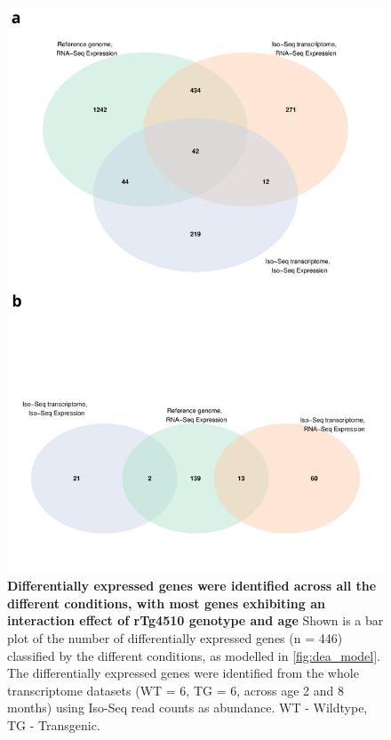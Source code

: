 \begin{figure}[h]
	\centering
	\includegraphics[page=5,trim={0 20cm 0 0},clip,scale = 0.55]{Figures/WholeDifferentialAnalysis.pdf}
	\captionsetup{width=0.95\textwidth}
	\caption[Differentially expressed genes classified by conditions]%
	{\textbf{Differentially expressed genes were identified across all the different conditions, with most genes exhibiting an interaction effect of rTg4510 genotype and age} Shown is a bar plot of the number of differentially expressed genes (n = 446) classified by the different conditions, as modelled in \cref{fig:dea_model}. The differentially expressed genes were identified from the whole transcriptome datasets (WT = 6, TG = 6, across age 2 and 8 months) using Iso-Seq read counts as abundance. WT - Wildtype, TG - Transgenic.}    
	\label{fig:dea_model_num}
\end{figure}

